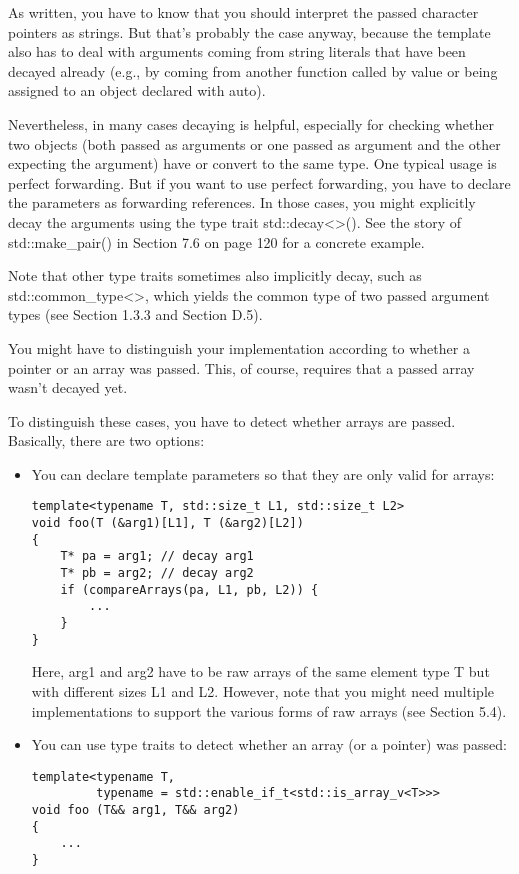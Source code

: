 As written, you have to know that you should interpret the passed character pointers as strings. But that’s probably the case anyway, because the template also has to deal with arguments coming from string literals that have been decayed already (e.g., by coming from another function called by value or being assigned to an object declared with auto).

Nevertheless, in many cases decaying is helpful, especially for checking whether two objects (both passed as arguments or one passed as argument and the other expecting the argument) have or convert to the same type. One typical usage is perfect forwarding. But if you want to use perfect forwarding, you have to declare the parameters as forwarding references. In those cases, you might explicitly decay the arguments using the type trait std::decay<>(). See the story of std::make\_pair() in Section 7.6 on page 120 for a concrete example.

Note that other type traits sometimes also implicitly decay, such as std::common\_type<>, which yields the common type of two passed argument types (see Section 1.3.3 and Section D.5).


You might have to distinguish your implementation according to whether a pointer or an array was passed. This, of course, requires that a passed array wasn’t decayed yet.

To distinguish these cases, you have to detect whether arrays are passed. Basically, there are two options:

\begin{itemize}
\item 
You can declare template parameters so that they are only valid for arrays:

\begin{lstlisting}[style=styleCXX]
template<typename T, std::size_t L1, std::size_t L2>
void foo(T (&arg1)[L1], T (&arg2)[L2])
{
	T* pa = arg1; // decay arg1
	T* pb = arg2; // decay arg2
	if (compareArrays(pa, L1, pb, L2)) {
		...
	}
}
\end{lstlisting}

Here, arg1 and arg2 have to be raw arrays of the same element type T but with different sizes L1 and L2. However, note that you might need multiple implementations to support the various forms of raw arrays (see Section 5.4).

\item 
You can use type traits to detect whether an array (or a pointer) was passed:

\begin{lstlisting}[style=styleCXX]
template<typename T,
		 typename = std::enable_if_t<std::is_array_v<T>>>
void foo (T&& arg1, T&& arg2)
{
	...
}
\end{lstlisting}
\end{itemize}

